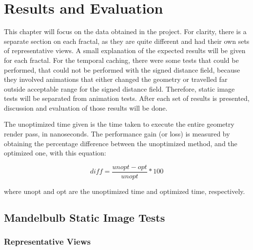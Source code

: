 \chapter{Results and Evaluation}
\label{chapter:results-and-evaluation}

This chapter will focus on the data obtained in the project. For clarity, there is a separate section on each fractal, as they are quite different and had their own sets of representative views. A small explanation of the expected results will be given for each fractal. For the temporal caching, there were some tests that could be performed, that could not be performed with the signed distance field, because they involved animations that either changed the geometry or travelled far outside acceptable range for the signed distance field. Therefore, static image tests will be separated from animation tests. After each set of results is presented, discussion and evaluation of those results will be done.\newline

The unoptimized time given is the time taken to execute the entire geometry render pass, in nanoseconds. The performance gain (or loss) is measured by obtaining the percentage difference between the unoptimized method, and the optimized one, with this equation:

\begin{equation}
	diff = \frac{unopt - opt}{unopt} * 100
\end{equation}

where unopt and opt are the unoptimized time and optimized time, respectively.

\section{Mandelbulb Static Image Tests}

\subsection{Representative Views}

